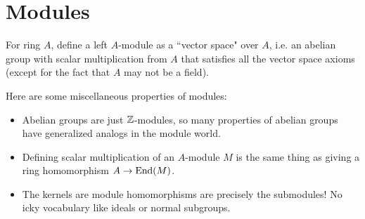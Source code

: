 \section{Modules}
For ring $A$, define a left $A$-module as a ``vector space" over $A$, i.e. an abelian group with scalar multiplication from $A$ that satisfies all the vector space axioms (except for the fact that $A$ may not be a field).

Here are some miscellaneous properties of modules:
\begin{itemize}
    \item Abelian groups are just ${\mathbb Z}$-modules, so many properties of abelian groups have generalized analogs in the module world.
    \item Defining scalar multiplication of an $A$-module $M$ is the same thing as giving a ring homomorphism $A \rightarrow \operatorname{End}(M)$.
    \item The kernels are module homomorphisms are precisely the submodules! No icky vocabulary like ideals or normal subgroups.
\end{itemize}
